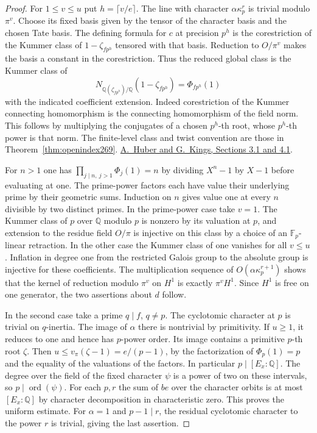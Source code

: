 \documentclass[a4paper,11pt]{article}
\theoremstyle{definition}
\theoremstyle{remark}
\numberwithin{equation}{section}
\begin{document}
\begin{proof}
For \(1\le v\le u\) put \(h=\lceil v/e\rceil\). The line with
character \(\alpha\kappa_p^r\) is trivial modulo \(\pi^v\).
Choose its fixed basis given by the tensor of the character
basis and the chosen Tate basis. The defining formula for \(c\)
at precision \(p^h\) is the corestriction of the Kummer class
of \(1-\zeta_{fp^h}\) tensored with that basis. Reduction to
\(O/\pi^v\) makes the basis a constant in the corestriction.
Thus the reduced global class is the Kummer class of
\[
      N_{\mathbb Q(\zeta_{fp^h})/\mathbb Q}(1-\zeta_{fp^h})
                            =\Phi_{fp^h}(1)
\]
with the indicated coefficient extension. Indeed corestriction
of the Kummer connecting homomorphism is the connecting
homomorphism of the field norm. This follows by multiplying
the conjugates of a chosen \(p^h\)-th root, whose \(p^h\)-th
power is that norm. The finite-level class and twist convention
are those in Theorem~\ref{thm:openindex269}.
\href{https://arxiv.org/abs/math/0101071}{A.~Huber and G.~Kings,
Sections 3.1 and 4.1}.

For \(n>1\) one has \(\prod_{j\mid n,\ j>1}\Phi_j(1)=n\) by
dividing \(X^n-1\) by \(X-1\) before evaluating at one.
The prime-power factors each have value their underlying
prime by their geometric sums. Induction on \(n\) gives value
one at every \(n\) divisible by two distinct primes.
In the prime-power case take \(v=1\). The Kummer class of \(p\)
over \(\mathbb Q\) modulo \(p\) is nonzero by its valuation at
\(p\), and extension to the residue field \(O/\pi\) is injective
on this class by a choice of an \(\mathbb F_p\)-linear retraction.
In the other case the Kummer class of one vanishes for all
\(v\le u\). Inflation in degree one from the restricted
Galois group to the absolute group is injective for these
coefficients. The multiplication sequence of \(O(\alpha
\kappa_p^{r+1})\) shows that the kernel of reduction modulo
\(\pi^v\) on \(H^1\) is exactly \(\pi^vH^1\). Since \(H^1\)
is free on one generator, the two assertions about \(d\)
follow.

In the second case take a prime \(q\mid f\), \(q\ne p\).
The cyclotomic character at \(p\) is trivial on \(q\)-inertia.
The image of \(\alpha\) there is nontrivial by primitivity.
If \(u\ge1\), it reduces to one and hence has \(p\)-power
order. Its image contains a primitive \(p\)-th root \(\zeta\).
Then \(u\le v_\pi(\zeta-1)=e/(p-1)\), by the factorization of
\(\Phi_p(1)=p\) and the equality of the valuations of the
factors. In particular \(p\mid [E_x:\mathbb Q]\). The degree
over the field of the fixed character \(\psi\) is a power of
two on these intervals, so \(p\mid\operatorname{ord}(\psi)\).
For each \(p,r\) the sum of \(be\) over the character orbits
is at most \([E_x:\mathbb Q]\) by character decomposition in
characteristic zero. This proves the uniform estimate. For
\(\alpha=1\) and \(p-1\mid r\), the residual cyclotomic
character to the power \(r\) is trivial, giving the last assertion.
\end{proof}
\end{document}
